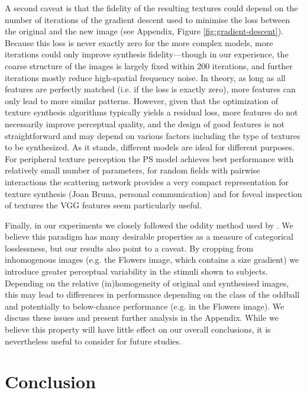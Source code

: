 \documentclass[doc, 11pt,a4paper,natbib]{apa6}\usepackage[]{graphicx}\usepackage[]{color}
\begin{document}
A second caveat is that the fidelity of the resulting textures could depend on the number of iterations of the gradient descent used to minimise the loss between the original and the new image (see Appendix, Figure \ref{fig:gradient-descent}).
Because this loss is never exactly zero for the more complex models, more iterations could only improve synthesis fidelity---though in our experience, the coarse structure of the images is largely fixed within 200 iterations, and further iterations mostly reduce high-spatial frequency noise.
In theory, as long as all features are perfectly matched (i.e. if the loss is exactly zero), more features can only lead to more similar patterns.
However, given that the optimization of texture synthesis algorithms typically yields a residual loss, more features do not necessarily improve perceptual quality, and the design of good features is not straightforward and may depend on various factors including the type of textures to be synthesized.
As it stands, different models are ideal for different purposes. 
For peripheral texture perception the PS model achieves best performance with relatively small number of parameters, for random fields with pairwise interactions the scattering network provides a very compact representation for texture synthesis (Joan Bruna, personal communication) and for foveal inspection of textures the VGG features seem particularly useful. 

Finally, in our experiments we closely followed the oddity method used by \citet{balas_texture_2006}.
We believe this paradigm has many desirable properties as a measure of categorical losslessness, but our results also point to a caveat.
By cropping from inhomogenous images (e.g. the Flowers image, which contains a size gradient) we introduce greater perceptual variability in the stimuli shown to subjects.
Depending on the relative (in)homogeneity of original and synthesised images, this may lead to differences in performance depending on the class of the oddball and potentially to below-chance performance (e.g. in the Flowers image).
We discuss these issues and present further analysis in the Appendix.
While we believe this property will have little effect on our overall conclusions, it is nevertheless useful to consider for future studies.

\section{Conclusion}
\end{document}
